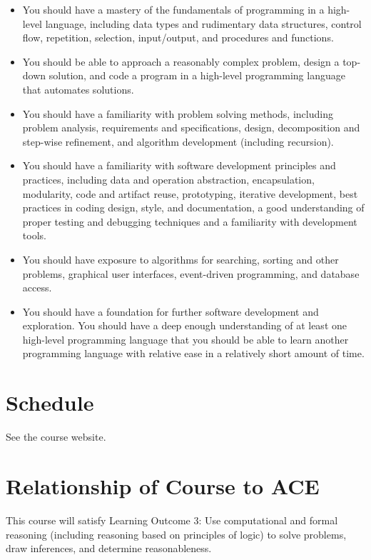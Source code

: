 \documentclass[12pt]{scrartcl}
\begin{document}
\begin{itemize}
  \item You should have a mastery of the fundamentals of programming 
  in a high-level language, including data types and rudimentary data 
  structures, control flow, repetition, selection, input/output, 
  and procedures and functions.
  \item You should be able to approach a reasonably complex problem, 
  design a top-down solution, and code a program in a high-level programming 
  language that automates solutions.
  \item You should have a familiarity with problem solving methods, 
  including problem analysis, requirements and specifications, design, 
  decomposition and step-wise refinement, and algorithm development 
  (including recursion).
  \item You should have a familiarity with software development principles 
  and practices, including data and operation abstraction, encapsulation, 
  modularity, code and artifact reuse, prototyping, iterative development, 
  best practices in coding design, style, and documentation, a good understanding
  of proper testing and debugging techniques and a familiarity with
  development tools.
  \item You should have exposure to algorithms for searching, sorting 
  and other problems, graphical user interfaces, event-driven programming, 
  and database access. 
  \item You should have a foundation for further software development and
  exploration.  You should have a deep enough understanding of at least
  one high-level programming language that you should be able to learn another
  programming language with relative ease in a relatively short amount of time.  
\end{itemize}

\section{Schedule}

See the course website.

\section{Relationship of Course to ACE}

This course will satisfy Learning Outcome 3: Use computational 
and formal reasoning (including reasoning based on principles 
of logic) to solve problems, draw inferences, and determine 
reasonableness.
\end{document}
